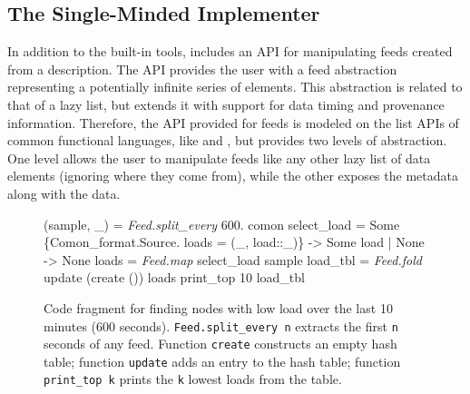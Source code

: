 

\subsection{The Single-Minded Implementer}

In addition to the built-in tools, \padsd{} includes an API for
manipulating feeds created from a description. The API provides the
user with a feed abstraction representing a potentially infinite
series of elements. This abstraction is related to that of a lazy
list, but extends it with support for data timing and provenance
information. Therefore, the API provided for feeds is modeled on the
list APIs of common functional languages, like \ocaml and \haskell,
but provides two levels of abstraction. One level allows the user to
manipulate feeds like any other lazy list of data elements (ignoring
where they come from), while the other exposes the metadata along with
the data. 



\begin{figure}[tb]
\begin{codebox}
 (sample, \_) = \textit{Feed.split_every} 600. comon 
 select_load = 
    Some \{Comon_format.Source.
          loads = (_, load::_)\} -> Some load
  | None -> None 
 loads    = \textit{Feed.map} select_load sample 
 load_tbl = \textit{Feed.fold} update (create ()) loads 
  print_top 10 load_tbl
\end{codebox}
  \caption{Code fragment for finding \planetlab nodes with low load
  over the last 10 minutes (600 seconds).  \texttt{Feed.split\_every n}
  extracts the first \texttt{n} seconds of any feed. 
  Function \texttt{create} constructs an empty hash table; function 
  \texttt{update} adds
  an entry to the hash table; function
  \texttt{print\_top k} prints the \texttt{k} lowest loads from the table.}
\label{fig:sample-loads}
\end{figure}



